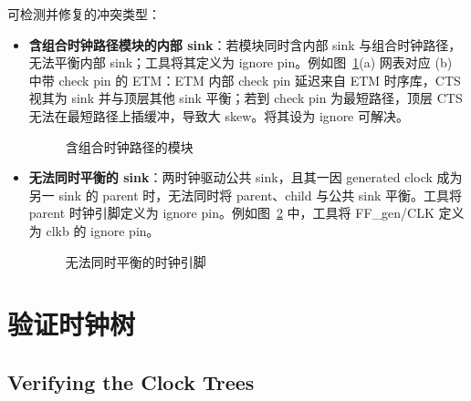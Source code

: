 可检测并修复的冲突类型：
\begin{itemize}
  \item \textbf{含组合时钟路径模块的内部 sink}：若模块同时含内部 sink 与组合时钟路径，无法平衡内部 sink；工具将其定义为 ignore pin。例如图~\ref{fig:cts-comb-mod}(a) 网表对应 (b) 中带 check pin 的 ETM：ETM 内部 check pin 延迟来自 ETM 时序库，CTS 视其为 sink 并与顶层其他 sink 平衡；若到 check pin 为最短路径，顶层 CTS 无法在最短路径上插缓冲，导致大 skew。将其设为 ignore 可解决。
\begin{figure}[htbp]
\centering
{}
\caption{含组合时钟路径的模块}
\label{fig:cts-comb-mod}
\end{figure}
  \item \textbf{无法同时平衡的 sink}：两时钟驱动公共 sink，且其一因 generated clock 成为另一 sink 的 parent 时，无法同时将 parent、child 与公共 sink 平衡。工具将 parent 时钟引脚定义为 ignore pin。例如图~\ref{fig:cts-unbal} 中，工具将 FF\_gen/CLK 定义为 clkb 的 ignore pin。
\begin{figure}[htbp]
\centering
{}
\caption{无法同时平衡的时钟引脚}
\label{fig:cts-unbal}
\end{figure}
\end{itemize}

\section{验证时钟树}
\subsection*{Verifying the Clock Trees}


